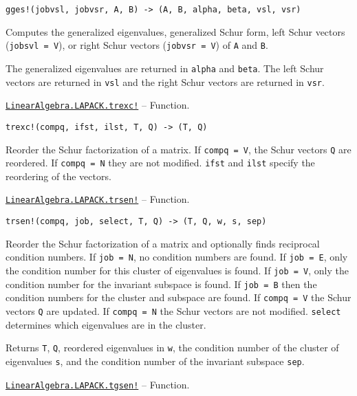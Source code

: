 \begin{adjustwidth}{2em}{0pt}


\begin{verbatim}
gges!(jobvsl, jobvsr, A, B) -> (A, B, alpha, beta, vsl, vsr)
\end{verbatim}

Computes the generalized eigenvalues, generalized Schur form, left Schur vectors (\texttt{jobsvl = V}), or right Schur vectors (\texttt{jobvsr = V}) of \texttt{A} and \texttt{B}.

The generalized eigenvalues are returned in \texttt{alpha} and \texttt{beta}. The left Schur vectors are returned in \texttt{vsl} and the right Schur vectors are returned in \texttt{vsr}.



\end{adjustwidth}
\hypertarget{16392841550634697146}{} 
\hyperlink{16392841550634697146}{\texttt{LinearAlgebra.LAPACK.trexc!}}  -- {Function.}

\begin{adjustwidth}{2em}{0pt}


\begin{verbatim}
trexc!(compq, ifst, ilst, T, Q) -> (T, Q)
\end{verbatim}

Reorder the Schur factorization of a matrix. If \texttt{compq = V}, the Schur vectors \texttt{Q} are reordered. If \texttt{compq = N} they are not modified. \texttt{ifst} and \texttt{ilst} specify the reordering of the vectors.



\end{adjustwidth}
\hypertarget{14222318539033253394}{} 
\hyperlink{14222318539033253394}{\texttt{LinearAlgebra.LAPACK.trsen!}}  -- {Function.}

\begin{adjustwidth}{2em}{0pt}


\begin{verbatim}
trsen!(compq, job, select, T, Q) -> (T, Q, w, s, sep)
\end{verbatim}

Reorder the Schur factorization of a matrix and optionally finds reciprocal condition numbers. If \texttt{job = N}, no condition numbers are found. If \texttt{job = E}, only the condition number for this cluster of eigenvalues is found. If \texttt{job = V}, only the condition number for the invariant subspace is found. If \texttt{job = B} then the condition numbers for the cluster and subspace are found. If \texttt{compq = V} the Schur vectors \texttt{Q} are updated. If \texttt{compq = N} the Schur vectors are not modified. \texttt{select} determines which eigenvalues are in the cluster.

Returns \texttt{T}, \texttt{Q}, reordered eigenvalues in \texttt{w}, the condition number of the cluster of eigenvalues \texttt{s}, and the condition number of the invariant subspace \texttt{sep}.



\end{adjustwidth}
\hypertarget{4226534331460521506}{} 
\hyperlink{4226534331460521506}{\texttt{LinearAlgebra.LAPACK.tgsen!}}  -- {Function.}

